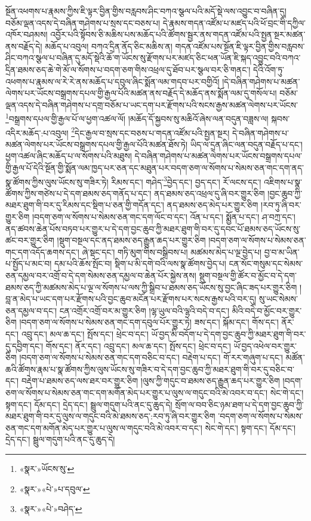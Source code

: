སྔོན་འཕགས་པ་རྣམས་ཀྱིས་ཇི་ལྟར་བྱིན་གྱིས་བརླབས་ཤིང་བཀའ་སྩལ་པའི་མདོ་སྡེ་ལས་འབྱུང་བ་བཞིན་དུ། བཅོམ་ལྡན་འདས་དེ་བཞིན་གཤེགས་པ་སྲས་དང་བཅས་པ། དེ་རྣམས་གདན་འཛོམ་པ་མཛད་པའི་ཕོ་བྲང་གི་དཀྱིལ་འཁོར་བཤམས། འབྱོར་པའི་སྟོབས་ཅི་མཆིས་པས་མཆོད་པའི་ཚོགས་སྦྱར་ནས་གདན་འཛོམ་པའི་སྤྱན་སྔར་མཚན་ནས་བརྗོད་དེ། མཆོད་པ་འབུལ། བཀའ་དྲིན་ནོད་ཅིང་མཆིས་ན། གདན་འཛོམ་པས་སྔོན་ཇི་ལྟར་བྱིན་གྱིས་བརླབས་ཤིང་བཀའ་སྩལ་པ་བཞིན་དུ་མདོ་སྡེའི་ཆོ་ག་ཡོངས་སུ་རྫོགས་པར་མཛད་ཅིང་ཕན་ཡོན་ཇི་སྐད་འབྱུང་བའི་བཀའ་དྲིན་ཐམས་ཅད་ཆེ་གེ་མོ་ལ་སོགས་པ་བདག་ཅག་གིས་འཕྲལ་དུ་ཐོབ་པར་སྩལ་བར་ཅི་གནང་། དེའི་འོག་ཏུ་འཕགས་པ་རྣམས་ལ་རེ་རེ་ནས་མཆོད་པ་དབུལ་ཞིང་སྨོན་ལམ་གདབ་པར་བགྱིའོ། །དེ་བཞིན་གཤེགས་པ་མཚན་ལེགས་པར་ཡོངས་བསྒྲགས་དཔལ་གྱི་རྒྱལ་པོའི་མཚན་ནས་བརྗོད་དེ་མཆོད་ནས་སྨོན་ལམ་དུ་གསོལ་པ། བཅོམ་ལྡན་འདས་དེ་བཞིན་གཤེགས་པ་དགྲ་བཅོམ་པ་ཡང་དག་པར་རྫོགས་པའི་སངས་རྒྱས་མཚན་ལེགས་པར་ཡོངས་\footnote{«སྣར་»ཡོངས་སུ་}བསྒྲགས་དཔལ་གྱི་རྒྱལ་པོ་ལ་ཕྱག་འཚལ་ལོ། །མཆོད་དོ་སྐྱབས་སུ་མཆིའོ་ཞེས་ལན་བདུན་བཟླས་ལ། སྐབས་འདིར་མཆོད་:པ་འབུལ། \footnote{«སྣར་»«པེ་»པ་དབུལ་}དེང་རྒྱལ་བ་སྲས་དང་བཅས་པ་གདན་འཛོམ་པའི་སྤྱན་སྔར། དེ་བཞིན་གཤེགས་པ་མཚན་ལེགས་པར་ཡོངས་བསྒྲགས་དཔལ་གྱི་རྒྱལ་པོའི་མཚན་ཐོས་ཏེ། ཡིད་ལ་དྲན་ཞིང་ལན་བདུན་བརྗོད་པ་དང་། ཕྱག་འཚལ་ཞིང་མཆོད་པ་ལ་སོགས་པའི་མཐུས། དེ་བཞིན་གཤེགས་པ་མཚན་ལེགས་པར་ཡོངས་བསྒྲགས་དཔལ་གྱི་རྒྱལ་པོ་དེའི་སྔོན་གྱི་སྨོན་ལམ་ཁྱད་པར་ཅན་དང་མཐུན་པར་བདག་ཅག་ལ་སོགས་པ་སེམས་ཅན་གང་དག་ནད་སྣ་ཚོགས་ཀྱིས་ལུས་ཡོངས་སུ་གཟིར་ཏེ། རིམས་དང་། གཤེད་\footnote{«སྣར་»«པེ་»བཤེད་}བྱེད་དང་། བྱད་དང་། རོ་ལངས་དང་། འཇིགས་པ་སྣ་ཚོགས་ཀྱིས་གཙེས་པ་དེ་དག་ཐམས་ཅད་གནོད་པ་དང་། ནད་ཐམས་ཅད་འཕྲལ་དུ་ཞི་བར་གྱུར་ཅིག །བྱང་ཆུབ་ཀྱི་མཐར་ཐུག་གི་བར་དུ་རིམས་དང་སྡིག་པ་ཅན་གྱི་གདོན་དང་། ནད་ཐམས་ཅད་མེད་པར་གྱུར་ཅིག །རབ་ཏུ་ཞི་བར་གྱུར་ཅིག །བདག་ཅག་ལ་སོགས་པ་སེམས་ཅན་གང་དག་ལོང་བ་དང་། འོན་པ་དང་། སྨྱོན་པ་དང་། ཤ་བཀྲ་དང་། ནད་ཚབས་ཆེན་པོས་བཏབ་པར་གྱུར་པ་དེ་དག་བྱང་ཆུབ་ཀྱི་མཐར་ཐུག་གི་བར་དུ་དབང་པོ་ཐམས་ཅད་ཡོངས་སུ་ཚང་བར་གྱུར་ཅིག །སྡུག་བསྔལ་དང་ནད་ཐམས་ཅད་རྒྱུན་ཆད་པར་གྱུར་ཅིག །བདག་ཅག་ལ་སོགས་པ་སེམས་ཅན་གང་དག་འདོད་ཆགས་དང་། ཞེ་སྡང་དང་། གཏི་མུག་གིས་བསྒྲིབས་པ། མཚམས་མེད་པ་ལྔ་བྱེད་པ། བྱ་བ་མ་ཡིན་པ་སྤྱོད་པ་མང་བ། དམ་པའི་ཆོས་སྤོང་བ། སྡིག་པ་མི་དགེ་བའི་ལས་སྣ་ཚོགས་བྱེད་པ། ངན་སོང་གསུམ་དང་སེམས་ཅན་དམྱལ་བར་འགྲོ་བ་དེ་དག་སེམས་ཅན་དམྱལ་བ་ཆེན་པོར་སྐྱེས་ནས། སྡུག་བསྔལ་གྱི་ཚོར་བ་མྱོང་བ་དེ་དག་ཐམས་ཅད་ཀྱི་མཚམས་མེད་པ་ལྔ་ལ་སོགས་པ་ལས་ཀྱི་སྒྲིབ་པ་ཐམས་ཅད་ཡོངས་སུ་བྱང་ཞིང་ཟད་པར་གྱུར་ཅིག །བླ་ན་མེད་པ་ཡང་དག་པར་རྫོགས་པའི་བྱང་ཆུབ་མངོན་པར་རྫོགས་པར་སངས་རྒྱས་པའི་བར་དུ། སུ་ཡང་སེམས་ཅན་དམྱལ་བ་དང་། ངན་འགྲོར་འགྲོ་བར་མ་གྱུར་ཅིག །ལྷ་ཡུལ་བའི་ལྷའི་བདེ་བ་དང་། མིའི་བདེ་བ་མྱོང་བར་གྱུར་ཅིག །བདག་ཅག་ལ་སོགས་པ་སེམས་ཅན་གང་དག་དབུལ་པོར་གྱུར་ཏེ། ཟས་དང་། སྐོམ་དང་། གོས་དང་། ནོར་དང་། འབྲུ་དང་། མལ་ཆ་དང་། སྤོས་དང་། ཕྲེང་བ་དང་། ཡོ་བྱད་མི་བདོག་པ་དེ་དག་བྱང་ཆུབ་ཀྱི་མཐར་ཐུག་གི་བར་དུ་དབྱིག་དང་། གོས་དང་། ནོར་དང་། འབྲུ་དང་། མལ་ཆ་དང་། སྤོས་དང་། ཕྲེང་བ་དང་། ཡོ་བྱད་འཕེལ་བར་གྱུར་ཅིག །བདག་ཅག་ལ་སོགས་པ་སེམས་ཅན་གང་དག་བཅིང་བ་དང་། བརྡེག་པ་དང་། གོ་རར་གཞུག་པ་དང་། མཚོན་ཆའི་ཚོགས་རྣམ་པ་སྣ་ཚོགས་ཀྱིས་ལུས་ཡོངས་སུ་གཟིར་བ་དེ་དག་བྱང་ཆུབ་ཀྱི་མཐར་ཐུག་གི་བར་དུ་བཅིང་བ་དང་། བརྡེག་པ་ཐམས་ཅད་ལས་ཐར་བར་གྱུར་ཅིག །ལུས་ཀྱི་གདུང་བ་ཐམས་ཅད་རྒྱུན་ཆད་པར་གྱུར་ཅིག །བདག་ཅག་ལ་སོགས་པ་སེམས་ཅན་གང་དག་མགོན་མེད་པར་གྱུར་པ་ལུས་ལ་གདུང་བའི་མེ་འབར་བ་དང་། སེང་གེ་དང་། སྟག་དང་། དོམ་དང་། དྲེད་དང་། སྦྲུལ་གདུག་པའི་ནང་དུ་ཆུད་དེ། སྲོག་ལ་བབ་ཅིང་ཉམ་ཐག་པ་དེ་དག་བྱང་ཆུབ་ཀྱི་མཐར་ཐུག་གི་བར་དུ་ལུས་ལ་གདུང་བའི་མེ་ཐམས་ཅད་:རབ་ཏུ་ཞི་བར་གྱུར་ཅིག ་བདག་ཅག་ལ་སོགས་པ་སེམས་ཅན་གང་དག་མགོན་མེད་པར་གྱུར་པ་ལུས་ལ་གདུང་བའི་མེ་འབར་བ་དང་། སེང་གེ་དང་། སྟག་དང་། དོམ་དང་། དྲེད་དང་། སྦྲུལ་གདུག་པའི་ནང་དུ་ཆུད་དེ། 